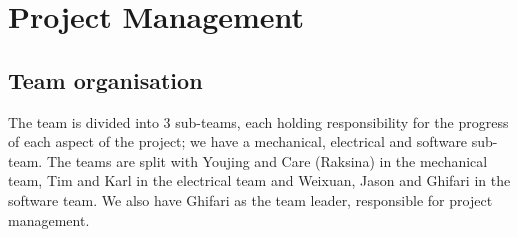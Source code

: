 










\maketitle


\section{Project Management}

\subsection{Team organisation}

The team is divided into 3 sub-teams, each holding responsibility for the progress of each aspect of the project; we have a mechanical, electrical and software sub-team. The teams are split with Youjing and Care (Raksina) in the mechanical team, Tim and Karl in the electrical team and Weixuan, Jason and Ghifari in the software team. We also have Ghifari as the team leader, responsible for project management.


